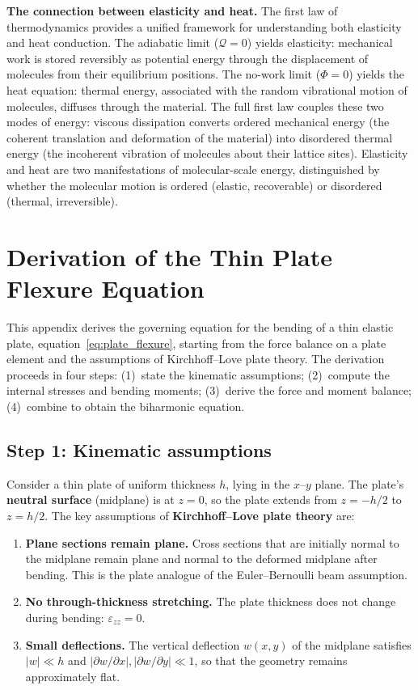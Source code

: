 \documentclass[11pt]{article}
\begin{document}
\medskip
\noindent\textbf{The connection between elasticity and heat.}  The first law of thermodynamics provides a unified framework for understanding both elasticity and heat conduction.  The adiabatic limit ($\mathcal{Q} = 0$) yields elasticity: mechanical work is stored reversibly as potential energy through the displacement of molecules from their equilibrium positions.  The no-work limit ($\Phi = 0$) yields the heat equation: thermal energy, associated with the random vibrational motion of molecules, diffuses through the material.  The full first law couples these two modes of energy: viscous dissipation converts ordered mechanical energy (the coherent translation and deformation of the material) into disordered thermal energy (the incoherent vibration of molecules about their lattice sites).  Elasticity and heat are two manifestations of molecular-scale energy, distinguished by whether the molecular motion is ordered (elastic, recoverable) or disordered (thermal, irreversible).

\clearpage
\section{Derivation of the Thin Plate Flexure Equation}
\label{app:flexure_derivation}

This appendix derives the governing equation for the bending of a thin elastic plate, equation~\eqref{eq:plate_flexure}, starting from the force balance on a plate element and the assumptions of Kirchhoff--Love plate theory.  The derivation proceeds in four steps: (1)~state the kinematic assumptions; (2)~compute the internal stresses and bending moments; (3)~derive the force and moment balance; (4)~combine to obtain the biharmonic equation.

\subsection*{Step 1: Kinematic assumptions}

Consider a thin plate of uniform thickness $h$, lying in the $x$--$y$ plane.  The plate's \textbf{neutral surface} (midplane) is at $z = 0$, so the plate extends from $z = -h/2$ to $z = h/2$.  The key assumptions of \textbf{Kirchhoff--Love plate theory} are:
\begin{enumerate}
  \item \textbf{Plane sections remain plane.}  Cross sections that are initially normal to the midplane remain plane and normal to the deformed midplane after bending.  This is the plate analogue of the Euler--Bernoulli beam assumption.
  \item \textbf{No through-thickness stretching.}  The plate thickness does not change during bending: $\varepsilon_{zz} = 0$.
  \item \textbf{Small deflections.}  The vertical deflection $w(x,y)$ of the midplane satisfies $|w| \ll h$ and $|\partial w/\partial x|, |\partial w/\partial y| \ll 1$, so that the geometry remains approximately flat.
\end{enumerate}
\end{document}
